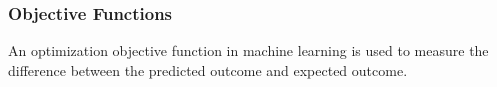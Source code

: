 \subsubsection{Objective Functions}
An optimization objective function in machine learning is used to measure the difference between the predicted outcome and expected outcome. 
